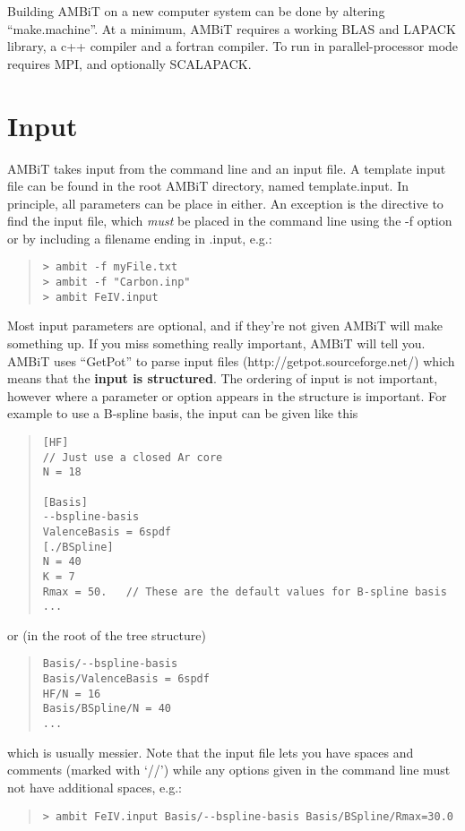 \documentclass[a4paper,11pt]{article}
\begin{document}
Building AMBiT on a new computer system can be done by altering ``make.machine''. At a minimum, AMBiT requires a working BLAS and LAPACK library, a c++ compiler and a fortran compiler. To run in parallel-processor mode requires MPI, and optionally SCALAPACK.

\section{Input}

AMBiT takes input from the command line and an input file. A template input file can be found in the root AMBiT directory, named template.input. In principle, all parameters can be place in either. An exception is the directive to find the input file, which \emph{must} be placed in the command line using the -f option or by including a filename ending in .input, e.g.:
\begin{quote}
\begin{verbatim}
> ambit -f myFile.txt
> ambit -f "Carbon.inp"
> ambit FeIV.input
\end{verbatim}
\end{quote}

Most input parameters are optional, and if they're not given AMBiT will make something up. If you miss something really important, AMBiT will tell you. AMBiT uses ``GetPot'' to parse input files (http://getpot.sourceforge.net/) which means that the \textbf{input is structured}. The ordering of input is not important, however where a parameter or option appears in the structure is important. For example to use a B-spline basis, the input can be given like this
\begin{quote}
\begin{verbatim}
[HF]
// Just use a closed Ar core
N = 18

[Basis]
--bspline-basis
ValenceBasis = 6spdf
[./BSpline]
N = 40
K = 7
Rmax = 50.   // These are the default values for B-spline basis
...
\end{verbatim}
\end{quote}
or (in the root of the tree structure)
\begin{quote}
\begin{verbatim}
Basis/--bspline-basis
Basis/ValenceBasis = 6spdf
HF/N = 16
Basis/BSpline/N = 40
...
\end{verbatim}
\end{quote}
which is usually messier.
Note that the input file lets you have spaces and comments (marked with `//') while any options given in the command line must not have additional spaces, e.g.:
\begin{quote}
\begin{verbatim}
> ambit FeIV.input Basis/--bspline-basis Basis/BSpline/Rmax=30.0
\end{verbatim}
\end{quote}
\end{document}
